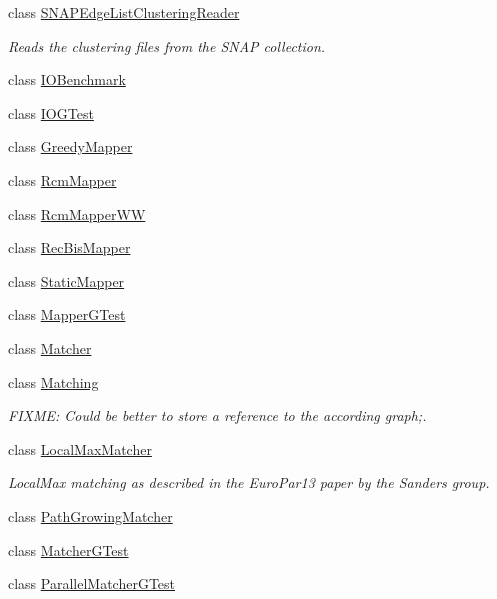 \begin{DoxyCompactItemize}
\item 
class \hyperlink{class_networ_kit_1_1_s_n_a_p_edge_list_clustering_reader}{S\-N\-A\-P\-Edge\-List\-Clustering\-Reader}
\begin{DoxyCompactList}\small\item\em Reads the clustering files from the S\-N\-A\-P collection. \end{DoxyCompactList}\item 
class \hyperlink{class_networ_kit_1_1_i_o_benchmark}{I\-O\-Benchmark}
\item 
class \hyperlink{class_networ_kit_1_1_i_o_g_test}{I\-O\-G\-Test}
\item 
class \hyperlink{class_networ_kit_1_1_greedy_mapper}{Greedy\-Mapper}
\item 
class \hyperlink{class_networ_kit_1_1_rcm_mapper}{Rcm\-Mapper}
\item 
class \hyperlink{class_networ_kit_1_1_rcm_mapper_w_w}{Rcm\-Mapper\-W\-W}
\item 
class \hyperlink{class_networ_kit_1_1_rec_bis_mapper}{Rec\-Bis\-Mapper}
\item 
class \hyperlink{class_networ_kit_1_1_static_mapper}{Static\-Mapper}
\item 
class \hyperlink{class_networ_kit_1_1_mapper_g_test}{Mapper\-G\-Test}
\item 
class \hyperlink{class_networ_kit_1_1_matcher}{Matcher}
\item 
class \hyperlink{class_networ_kit_1_1_matching}{Matching}
\begin{DoxyCompactList}\small\item\em F\-I\-X\-M\-E\-: Could be better to store a reference to the according graph;. \end{DoxyCompactList}\item 
class \hyperlink{class_networ_kit_1_1_local_max_matcher}{Local\-Max\-Matcher}
\begin{DoxyCompactList}\small\item\em Local\-Max matching as described in the Euro\-Par13 paper by the Sanders group. \end{DoxyCompactList}\item 
class \hyperlink{class_networ_kit_1_1_path_growing_matcher}{Path\-Growing\-Matcher}
\item 
class \hyperlink{class_networ_kit_1_1_matcher_g_test}{Matcher\-G\-Test}
\item 
class \hyperlink{class_networ_kit_1_1_parallel_matcher_g_test}{Parallel\-Matcher\-G\-Test}
\item 

\end{DoxyCompactItemize}
